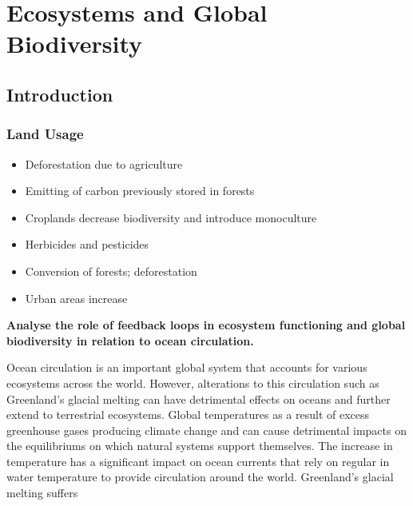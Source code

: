 \chapter{Ecosystems and Global Biodiversity}

\section{Introduction} \label{30/04/2025}

	\subsection{Land Usage} \label{01/05/2025}

		\begin{itemize}
			\item Deforestation due to agriculture
			\item Emitting of carbon previously stored in forests
			\item Croplands decrease biodiversity and introduce monoculture
			\item Herbicides and pesticides
			\item Conversion of forests; deforestation
			\item Urban areas increase
		\end{itemize}

		\textbf{Analyse the role of feedback loops in ecosystem functioning and global biodiversity in relation to ocean circulation.}

		Ocean circulation is an important global system that accounts for various ecosystems across the world. However, alterations to this circulation such as Greenland's glacial melting can have detrimental effects on oceans and further extend to terrestrial ecosystems. Global temperatures as a result of excess greenhouse gases producing climate change and can cause detrimental impacts on the equilibriums on which natural systems support themselves. The increase in temperature has a significant impact on ocean currents that rely on regular in water temperature to provide circulation around the world. Greenland's glacial melting suffers 

\newpage

